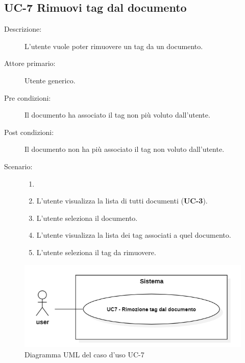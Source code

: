 \subsection{UC-7 Rimuovi tag dal documento}
\begin{description}
    \item[Descrizione:] L’utente vuole poter rimuovere un tag da un documento.
    \item[Attore primario:] Utente generico.
    \item[Pre condizioni:] Il documento ha associato il tag non più voluto dall’utente.
    \item[Post condizioni:] Il documento non ha più associato il tag non voluto dall’utente.
    \item[Scenario:]
    \begin{enumerate}
        \item[]
        \item L’utente visualizza la lista di tutti documenti (\textbf{UC-3}).
        \item L'utente seleziona il documento.
        \item L’utente visualizza la lista dei tag associati a quel documento.
        \item L’utente seleziona il tag da rimuovere.
    \end{enumerate}
\end{description}

\begin{figure}[H]
    \centering
    \includegraphics[width=0.8\linewidth]{UC7.png}
    \caption{Diagramma UML del caso d'uso UC-7}
    \label{fig:UC7}
\end{figure}

